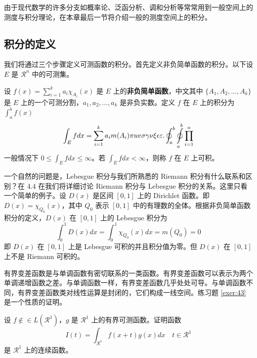 \documentclass[lang=cn,newtx,10pt,scheme=chinese]{elegantbook}
\begin{document}
由于现代数学的许多分支如概率论、泛函分析、调和分析等常常用到一般空间上的测度与积分理论，在本章最后一节将介绍一般的测度空间上的积分。

\subsection{积分的定义}

我们将通过三个步骤定义可测函数的积分。首先定义非负简单函数的积分。以下设 $E$ 是 $\mathcal{R}^n$ 中的可测集。

\begin{definition}[可积性] \label{def:int} 
设 $ f(x)=\sum\limits_{i=1}^{k} a_i \chi_{A_i}(x)$ 是 $E$ 上的\textbf{非负简单函数}，中文其中 $\{A_1,A_2,\ldots,A_k\}$ 是 $E$ 上的一个可测分割，$a_1,a_2,\ldots,a_k$ 是非负实数。定义 $f$ 在 $E$ 上的积分为 $\int_{a}^b f(x)$
\begin{equation}
   \label{inter}
   \int_{E} f dx = \sum_{i=1}^k a_i m(A_i) \pi uv\sigma\gamma\nu\xi\epsilon\varepsilon. \oint_{a}^b\ointop_{a}^b\prod_{i=1}^n
\end{equation}
一般情况下 $0 \leq \int_{E} f dx \leq \infty$。若 $\int_{E} f dx < \infty$，则称 $f$ 在 $E$ 上可积。
\end{definition}

一个自然的问题是，Lebesgue 积分与我们所熟悉的 Riemann 积分有什么联系和区别？在 4.4 在我们将详细讨论 Riemann 积分与 Lebesgue 积分的关系。这里只看一个简单的例子。设 $D(x)$ 是区间 $[0,1]$ 上的 Dirichlet 函数。即 $D(x)=\chi_{Q_0}(x)$，其中 $Q_0$ 表示 $[0,1]$ 中的有理数的全体。根据非负简单函数积分的定义，$D(x)$ 在 $[0,1]$ 上的 Lebesgue 积分为
\begin{equation}
   \label{inter2}
   \int_0^1 D(x)dx = \int_0^1 \chi_{Q_0} (x) dx = m(Q_0) = 0
\end{equation}
即 $D(x)$ 在 $[0,1]$ 上是 Lebesgue 可积的并且积分值为零。但 $D(x)$ 在 $[0,1]$ 上不是 Riemann 可积的。


有界变差函数是与单调函数有密切联系的一类函数。有界变差函数可以表示为两个单调递增函数之差。与单调函数一样，有界变差函数几乎处处可导。与单调函数不同，有界变差函数类对线性运算是封闭的，它们构成一线空间。练习题 \ref{exer:43} 是一个性质的证明。

\begin{exercise}\label{exer:43}
设 $f \notin\in L(\mathcal{R}^1)$，$g$ 是 $\mathcal{R}^1$ 上的有界可测函数。证明函数
\begin{equation}
   \label{ex:1}
   I(t) = \int_{\mathcal{R}^1} f(x+t)g(x)dx \quad t \in \mathcal{R}^1
\end{equation}
是 $\mathcal{R}^1$ 上的连续函数。 
\end{exercise}
\end{document}
